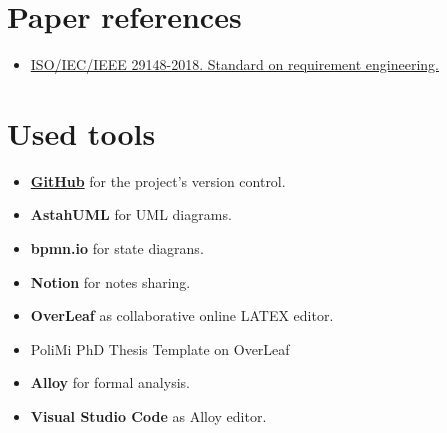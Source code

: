 \section{Paper references}
\label{sec:paper_references}%
\begin{itemize}
    \item \href{https://ieeexplore.ieee.org/document/8559686}{ISO/IEC/IEEE 29148-2018. Standard on requirement engineering.}
\end{itemize}


\section{Used tools}
\label{sec:used_tools}%
\begin{itemize}
    \item \href{https://github.com/MattiaBelfiore/BelfioreBenedettiBuccheri}{\textbf{GitHub}} for the project's version control.
    \item \textbf{AstahUML} for UML diagrams.
    \item \textbf{bpmn.io} for state diagrans.
    \item \textbf{Notion} for notes sharing.
    \item \textbf{OverLeaf} as collaborative online LATEX editor.
    \item PoliMi PhD Thesis Template on OverLeaf
    \item \textbf{Alloy} for formal analysis.
    \item \textbf{Visual Studio Code} as Alloy editor.
\end{itemize}
